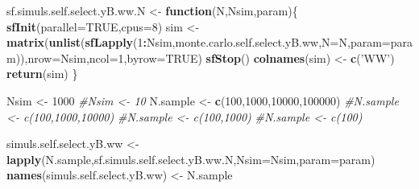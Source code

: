 \documentclass[]{book}
\newenvironment{Shaded}{\begin{snugshade}}{\end{snugshade}}
\newcommand{\CommentTok}[1]{\textcolor[rgb]{0.56,0.35,0.01}{\textit{#1}}}
\newcommand{\ControlFlowTok}[1]{\textcolor[rgb]{0.13,0.29,0.53}{\textbf{#1}}}
\newcommand{\DataTypeTok}[1]{\textcolor[rgb]{0.13,0.29,0.53}{#1}}
\newcommand{\DecValTok}[1]{\textcolor[rgb]{0.00,0.00,0.81}{#1}}
\newcommand{\KeywordTok}[1]{\textcolor[rgb]{0.13,0.29,0.53}{\textbf{#1}}}
\newcommand{\NormalTok}[1]{#1}
\newcommand{\OperatorTok}[1]{\textcolor[rgb]{0.81,0.36,0.00}{\textbf{#1}}}
\newcommand{\OtherTok}[1]{\textcolor[rgb]{0.56,0.35,0.01}{#1}}
\newcommand{\StringTok}[1]{\textcolor[rgb]{0.31,0.60,0.02}{#1}}
\theoremstyle{definition}
\theoremstyle{definition}
\theoremstyle{definition}
\theoremstyle{remark}
\begin{document}
\begin{Shaded}
\begin{Highlighting}[]
\NormalTok{sf.simuls.self.select.yB.ww.N <-}\StringTok{ }\ControlFlowTok{function}\NormalTok{(N,Nsim,param)\{}
  \KeywordTok{sfInit}\NormalTok{(}\DataTypeTok{parallel=}\OtherTok{TRUE}\NormalTok{,}\DataTypeTok{cpus=}\DecValTok{8}\NormalTok{)}
\NormalTok{  sim <-}\StringTok{ }\KeywordTok{matrix}\NormalTok{(}\KeywordTok{unlist}\NormalTok{(}\KeywordTok{sfLapply}\NormalTok{(}\DecValTok{1}\OperatorTok{:}\NormalTok{Nsim,monte.carlo.self.select.yB.ww,}\DataTypeTok{N=}\NormalTok{N,}\DataTypeTok{param=}\NormalTok{param)),}\DataTypeTok{nrow=}\NormalTok{Nsim,}\DataTypeTok{ncol=}\DecValTok{1}\NormalTok{,}\DataTypeTok{byrow=}\OtherTok{TRUE}\NormalTok{)}
  \KeywordTok{sfStop}\NormalTok{()}
  \KeywordTok{colnames}\NormalTok{(sim) <-}\StringTok{ }\KeywordTok{c}\NormalTok{(}\StringTok{'WW'}\NormalTok{)}
  \KeywordTok{return}\NormalTok{(sim)}
\NormalTok{\}}

\NormalTok{Nsim <-}\StringTok{ }\DecValTok{1000}
\CommentTok{#Nsim <- 10}
\NormalTok{N.sample <-}\StringTok{ }\KeywordTok{c}\NormalTok{(}\DecValTok{100}\NormalTok{,}\DecValTok{1000}\NormalTok{,}\DecValTok{10000}\NormalTok{,}\DecValTok{100000}\NormalTok{)}
\CommentTok{#N.sample <- c(100,1000,10000)}
\CommentTok{#N.sample <- c(100,1000)}
\CommentTok{#N.sample <- c(100)}

\NormalTok{simuls.self.select.yB.ww <-}\StringTok{ }\KeywordTok{lapply}\NormalTok{(N.sample,sf.simuls.self.select.yB.ww.N,}\DataTypeTok{Nsim=}\NormalTok{Nsim,}\DataTypeTok{param=}\NormalTok{param)}
\KeywordTok{names}\NormalTok{(simuls.self.select.yB.ww) <-}\StringTok{ }\NormalTok{N.sample}
\end{Highlighting}
\end{Shaded}
\end{document}
